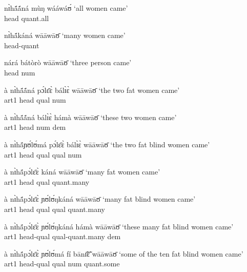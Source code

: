 \begin{exe}
\begin{exe}
\begin{exe}
{\begin{exe}
\begin{exe}
\begin{exe}
\begin{exe}
\begin{exe}
\begin{exe}
\begin{exe}
\begin{exe}
\begin{exe}
\begin{exe}
\begin{exe}
\begin{exe}
\begin{exe}
\begin{exe}
\begin{exe}
\begin{exe}
\begin{exe}
\begin{exe}
\begin{exe}
  \ex\label{ex:GRM-hq-all} 
 nɪ̀hã́ã́ná  mùŋ wááwáʊ́ {\rm  `all women  came'}\\  
{\sc head} {\sc quant}{\rm .all}

\ex\label{ex:GRM-hq-many} 
 nɪ̀hã́káná    wāāwāʊ̄  {\rm  `many women  came'}\\   
{\sc head-quant}  

  \ex\label{ex:GRM-hn} 
nárá bátòrò wāāwāʊ̄ {\rm  `three person  came'}\\  
  {\sc head} {\sc num}  

  \ex\label{ex:GRM-ahqln} 
à nɪ̀hã́ã́ná pɔ́lɛ̄ɛ̀ bálɪ̀ɛ̀   wāāwāʊ̄  {\rm  `the two fat women  came'}\\ 
 {\sc art1} {\sc head} {\sc qual} {\sc num}  

  \ex\label{ex:GRM-ahqlnd}
  à nɪ̀hã́ã́ná bálɪ̀ɛ̀ hámà wāāwāʊ̄    {\rm  `these two women  came'}\\ 
 {\sc art1} {\sc head} {\sc num} {\sc dem}  

  \ex\label{ex:GRM-ahqlqln}
à nɪ̀hã́ɲʊ́lʊ́má pɔ́lɛ̄ɛ̀ bálɪ̀ɛ̀ wāāwāʊ̄    {\rm  `the two fat blind women  came'} 
\\
  {\sc art1} {\sc head}  {\sc qual} {\sc qual}  {\sc num}  

\ex\label{ex:GRM-ahqlq} 
à nɪ̀hã́pɔ́lɛ̄ɛ̀    káná   wāāwāʊ̄  {\rm  `many fat women  came'}\\  
{\sc art1} {\sc head} {\sc qual} {\sc quant}{\rm .many}

 \ex\label{ex:GRM-ahqlqlq} 
à nɪ̀hã́pɔ́lɛ̄ɛ̀    ɲʊ́lʊ́ŋkáná   wāāwāʊ̄    {\rm  `many fat blind women  came'}   
\\ 
{\sc art1} {\sc head} {\sc qual} {\sc qual} {\sc quant}{\rm .many}  

  \ex\label{ex:GRM-ahqlqlqd} 
à nɪ̀hã́pɔ́lɛ̄ɛ̀   ɲʊ́lʊ́ŋkáná  hámà    wāāwāʊ̄ {\rm  `these many fat 
blind 
women  came'}\\ 
{\sc art1} {\sc head}-{\sc qual} {\sc qual}-{\sc quant}{\rm .many}  {\sc dem}


\ex\label{ex:GRM-phqlnq} 
à nɪ̀hã́pɔ́lɛ̄ɛ̀  ɲʊ́lʊ́má  fí bānɪ̃̄ɛ̃̄ wāāwāʊ̄    {\rm  `some of the ten fat 
blind women  came'}\\ 
{\sc art1} {\sc head}-{\sc qual} {\sc qual} {\sc num}  {\sc quant}{\rm .some} 




\end{exe}
\end{exe}
\end{exe}
\end{exe}
\end{exe}
\end{exe}
\end{exe}
\end{exe}
\end{exe}
\end{exe}
\end{exe}
\end{exe}
\end{exe}
\end{exe}
\end{exe}
\end{exe}
\end{exe}
\end{exe}
\end{exe}}
\end{exe}
\end{exe}
\end{exe}
